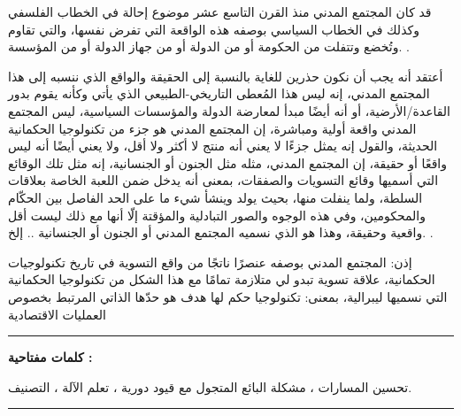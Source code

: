 \begin{Arabic}
\end{Arabic}


 

\begin{Arabic}
قد كان المجتمع المدني منذ القرن التاسع عشر موضوع إحالة في الخطاب الفلسفي وكذلك في الخطاب السياسي بوصفه هذه الواقعة التي تفرض نفسها، والتي تقاوم وتُخضع وتتفلت من الحكومة أو من الدولة أو من جهاز الدولة أو من المؤسسة. .

\end{Arabic}

\medskip

\begin{Arabic}أعتقد أنه يجب أن نكون حذرين للغاية بالنسبة إلى الحقيقة والواقع الذي ننسبه إلى هذا المجتمع المدني، إنه ليس هذا المُعطى التاريخي-الطبيعي الذي يأتي وكأنه يقوم بدور القاعدة/الأرضية، أو أنه أيضًا مبدأ لمعارضة الدولة والمؤسسات السياسية، ليس المجتمع المدني واقعة أولية ومباشرة، إن المجتمع المدني هو جزء من تكنولوجيا الحكمانية الحديثة، والقول إنه يمثل جزءًا لا يعني أنه منتج لا أكثر ولا أقل، ولا يعني أيضًا أنه ليس واقعًا أو حقيقة، إن المجتمع المدني، مثله مثل الجنون أو الجنسانية، إنه مثل تلك الوقائع التي أسميها وقائع التسويات والصفقات، بمعنى أنه يدخل ضمن اللعبة الخاصة بعلاقات السلطة، ولما ينفلت منها، بحيث يولد وينشأ شيء ما على الحد الفاصل بين الحكّام والمحكومين، وفي هذه الوجوه والصور التبادلية والمؤقتة إلّا أنها مع ذلك ليست أقل واقعية وحقيقة، وهذا هو الذي نسميه المجتمع المدني أو الجنون أو الجنسانية .. إلخ. .
\end{Arabic}

\medskip

\begin{Arabic}
إذن: المجتمع المدني بوصفه عنصرًا ناتجًا من واقع التسوية في تاريخ تكنولوجيات الحكمانية، علاقة تسوية تبدو لي متلازمة تمامًا مع هذا الشكل من تكنولوجيا الحكمانية التي نسميها ليبرالية، بمعنى: تكنولوجيا حكم لها هدف هو حدّها الذاتي المرتبط بخصوص العمليات الاقتصادية
\end{Arabic}

\medskip

\vspace{3cm}

\noindent\rule[2pt]{\textwidth}{0.5pt}


\begin{Arabic}
\textbf{كلمات مفتاحية :}

تحسين المسارات ، مشكلة البائع المتجول مع قيود دورية ، تعلم الآلة ، التصنيف.

\end{Arabic}

\noindent\rule[2pt]{\textwidth}{0.5pt}

